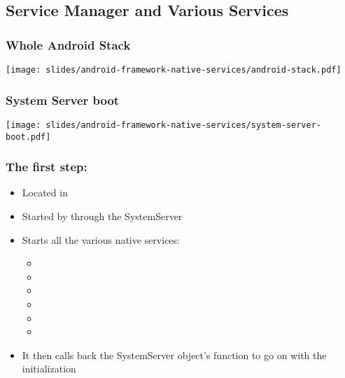 \subsection{Service Manager and Various Services}

\begin{frame}
  \frametitle{Whole Android Stack}
  \begin{center}
    \texttt{[image: slides/android-framework-native-services/android-stack.pdf]}
  \end{center}
\end{frame}

\begin{frame}
  \frametitle{System Server boot}
  \begin{center}
    \texttt{[image: slides/android-framework-native-services/system-server-boot.pdf]}
  \end{center}
\end{frame}

\begin{frame}
  \frametitle{The first step: }
  \begin{itemize}
  \item Located in 
  \item Started by  through the SystemServer
  \item Starts all the various native services:
    \begin{itemize}
    \item {}
    \item {}
    \item {}
    \item {}
    \item {}
    \item {}
    \end{itemize}
  \item It then calls back the SystemServer object's  function to
    go on with the initialization
  \end{itemize}
\end{frame}

